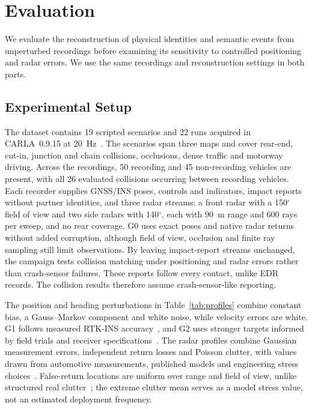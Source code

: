\section{Evaluation}
\label{sec:evaluation}
We evaluate the reconstruction of physical identities and semantic events
from unperturbed recordings before examining its sensitivity to controlled
positioning and radar errors. We use the same recordings and
reconstruction settings in both parts.

\subsection{Experimental Setup}
\label{subsec:setup}
The dataset contains 19 scripted scenarios and 22 runs acquired in
CARLA~0.9.15 at 20~Hz~\cite{dosovitskiy2017carla,carla2023docs}.
The scenarios span three maps and cover rear-end, cut-in, junction and
chain collisions, occlusions, dense traffic and motorway driving. Across
the recordings, 50 recording and 45 non-recording vehicles are present,
with all 26 evaluated collisions occurring between recording vehicles.
Each recorder supplies
GNSS/INS poses, controls and indicators, impact reports without partner
identities, and three radar streams: a front radar with a 150$^\circ$
field of view and two side radars with 140$^\circ$, each with 90~m range
and 600 rays per sweep, and no rear coverage. G0 uses exact poses and native radar
returns without added corruption, although field of view, occlusion and
finite ray sampling still limit observations. By leaving impact-report
streams unchanged, the campaign tests collision matching under
positioning and radar errors rather than crash-sensor failures. These
reports follow every contact, unlike EDR records.
The collision results therefore assume crash-sensor-like reporting.

The position and heading perturbations in Table~\ref{tab:profiles}
combine constant bias, a Gauss--Markov component and white noise, while
velocity errors are white. G1 follows
measured RTK-INS accuracy~\cite{volckaert2019integrity}, and G2 uses
stronger targets informed by field trials and receiver
specifications~\cite{lesjak2025cits,ublox2024zedf9r}. The radar profiles
combine Gaussian measurement errors, independent return losses and
Poisson clutter, with values drawn from automotive measurements,
published models and engineering stress
choices~\cite{schumann2021radarscenes,scheel2019variational,kraus2021ghost}.
False-return locations are uniform over range and field of view, unlike
structured real clutter~\cite{kopp2021clutter}; the extreme clutter mean
serves as a model stress value, not an estimated deployment frequency.

